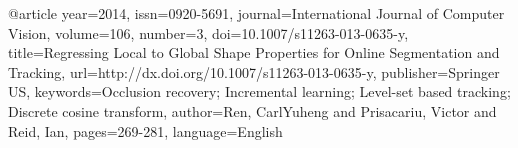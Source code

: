 @article{
year={2014},
issn={0920-5691},
journal={International Journal of Computer Vision},
volume={106},
number={3},
doi={10.1007/s11263-013-0635-y},
title={Regressing Local to Global Shape Properties for Online Segmentation and Tracking},
url={http://dx.doi.org/10.1007/s11263-013-0635-y},
publisher={Springer US},
keywords={Occlusion recovery; Incremental learning; Level-set based tracking; Discrete cosine transform},
author={Ren, CarlYuheng and Prisacariu, Victor and Reid, Ian},
pages={269-281},
language={English}
}